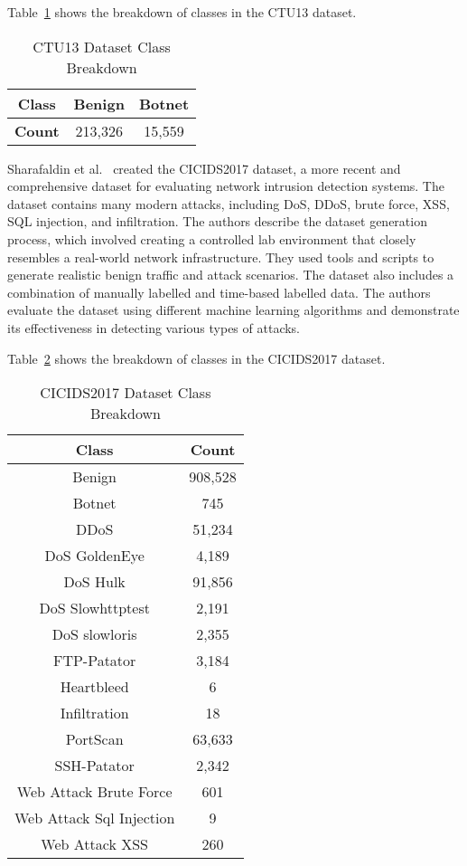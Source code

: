 Table~\ref{tab:ctu13_breakdown} shows the breakdown of classes in the CTU13 dataset.

\begin{table}[H]
    \centering
    \begin{tabular}{|c|c|c|} \hline 
         \textbf{Class}&  Benign& Botnet\\ \hline 
         \textbf{Count}&  213,326& 15,559\\ \hline
    \end{tabular}
    \caption{CTU13 Dataset Class Breakdown}\label{tab:ctu13_breakdown}
\end{table}

Sharafaldin et al.~\cite{sharafaldin2018toward} created the CICIDS2017 dataset, a more recent and comprehensive dataset for evaluating network intrusion detection systems. The dataset contains many modern attacks, including DoS, DDoS, brute force, XSS, SQL injection, and infiltration. The authors describe the dataset generation process, which involved creating a controlled lab environment that closely resembles a real-world network infrastructure. They used tools and scripts to generate realistic benign traffic and attack scenarios. The dataset also includes a combination of manually labelled and time-based labelled data. The authors evaluate the dataset using different machine learning algorithms and demonstrate its effectiveness in detecting various types of attacks.

Table~\ref{tab:cicids2017_breakdown} shows the breakdown of classes in the CICIDS2017 dataset.

\begin{table}[H]
    \centering
    \begin{tabular}{|c|c|} \hline 
    \textbf{Class} & \textbf{Count} \\ \hline 
    Benign & 908,528 \\ \hline 
    Botnet & 745 \\ \hline 
    DDoS & 51,234 \\ \hline 
    DoS GoldenEye & 4,189 \\ \hline 
    DoS Hulk & 91,856 \\ \hline 
    DoS Slowhttptest & 2,191 \\ \hline 
    DoS slowloris & 2,355 \\ \hline 
    FTP-Patator & 3,184 \\ \hline 
    Heartbleed & 6 \\ \hline 
    Infiltration & 18 \\ \hline 
    PortScan & 63,633 \\ \hline 
    SSH-Patator & 2,342 \\ \hline 
    Web Attack Brute Force & 601 \\ \hline 
    Web Attack Sql Injection & 9 \\ \hline 
    Web Attack XSS & 260 \\ \hline
    \end{tabular}
    \caption{CICIDS2017 Dataset Class Breakdown}\label{tab:cicids2017_breakdown}
\end{table}

